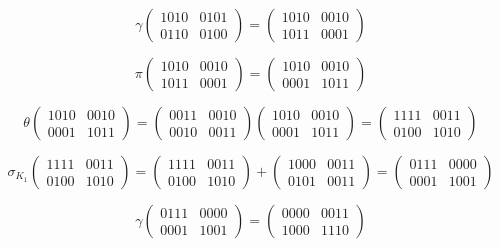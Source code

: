 \documentclass[a4paper]{article}
\begin{document}
$$\gamma \begin{pmatrix} 1010 & 0101 \\ 0110 & 0100 \end{pmatrix} = \begin{pmatrix} 1010 & 0010 \\ 1011 & 0001 \end{pmatrix}$$

$$\pi \begin{pmatrix} 1010 & 0010 \\ 1011 & 0001 \end{pmatrix} = \begin{pmatrix} 1010 & 0010 \\ 0001 & 1011 \end{pmatrix}$$

$$\theta \begin{pmatrix} 1010 & 0010 \\ 0001 & 1011 \end{pmatrix} = \begin{pmatrix} 0011 & 0010 \\ 0010 & 0011 \end{pmatrix}\begin{pmatrix} 1010 & 0010 \\ 0001 & 1011 \end{pmatrix} = \begin{pmatrix} 1111 & 0011 \\ 0100 & 1010 \end{pmatrix}$$

$$\sigma_{K_1} \begin{pmatrix} 1111 & 0011 \\ 0100 & 1010 \end{pmatrix} = \begin{pmatrix} 1111 & 0011 \\ 0100 & 1010 \end{pmatrix} + \begin{pmatrix} 1000 & 0011 \\ 0101 & 0011 \end{pmatrix} = \begin{pmatrix} 0111 & 0000 \\ 0001 & 1001 \end{pmatrix}$$

$$\gamma \begin{pmatrix} 0111 & 0000 \\ 0001 & 1001 \end{pmatrix} = \begin{pmatrix} 0000 & 0011 \\ 1000 & 1110 \end{pmatrix}$$
\end{document}
